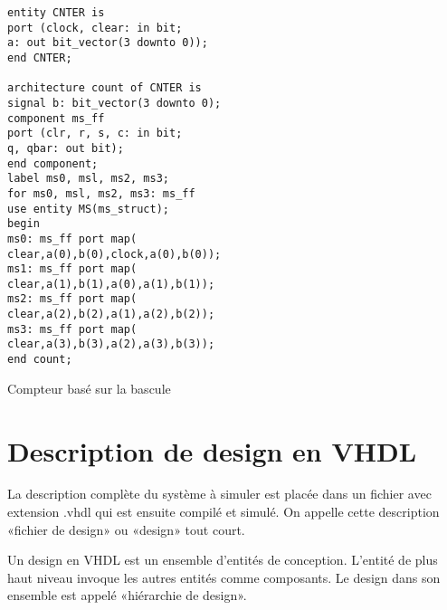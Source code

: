 \documentclass[letter, oneside]{book}
\begin{document}
\begin{listing}[htbp]
\begin{verbatim}
entity CNTER is
port (clock, clear: in bit;
a: out bit_vector(3 downto 0));
end CNTER;

architecture count of CNTER is
signal b: bit_vector(3 downto 0);
component ms_ff
port (clr, r, s, c: in bit;
q, qbar: out bit);
end component;
label ms0, msl, ms2, ms3;
for ms0, msl, ms2, ms3: ms_ff
use entity MS(ms_struct);
begin
ms0: ms_ff port map(
clear,a(0),b(0),clock,a(0),b(0));
ms1: ms_ff port map(
clear,a(1),b(1),a(0),a(1),b(1));
ms2: ms_ff port map(
clear,a(2),b(2),a(1),a(2),b(2));
ms3: ms_ff port map(
clear,a(3),b(3),a(2),a(3),b(3));
end count;
\end{verbatim}
\caption{Compteur basé sur la bascule}
\end{listing}


\section{Description de design en VHDL}
\label{sec:orgc6794c1}

La description complète du système à simuler est placée dans un
fichier avec extension .vhdl qui est ensuite compilé et simulé.  On
appelle cette description «fichier de design» ou «design» tout court.

Un design en VHDL est un ensemble d'entités de conception. L'entité de
plus haut niveau invoque les autres entités comme composants. Le design
dans son ensemble est appelé «hiérarchie de design».
\end{document}

